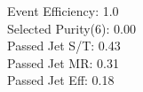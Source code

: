 Event Efficiency:   1.0\\ 
Selected Purity(6): 0.00\\ 
Passed Jet S/T:     0.43\\ 
Passed Jet MR:      0.31\\ 
Passed Jet Eff:     0.18